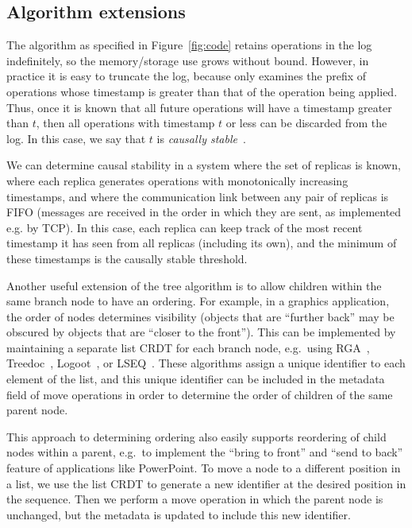 \documentclass[sigconf]{acmart}
\begin{document}
\subsection{Algorithm extensions}\label{sec:extensions}

The algorithm as specified in Figure~\ref{fig:code} retains operations in the log indefinitely, so the memory/storage use grows without bound.
However, in practice it is easy to truncate the log, because  only examines the prefix of operations whose timestamp is greater than that of the operation being applied.
Thus, once it is known that all future operations will have a timestamp greater than $t$, then all operations with timestamp $t$ or less can be discarded from the log.
In this case, we say that $t$ is \emph{causally stable}~\cite{Baquero:2014ed}.

We can determine causal stability in a system where the set of replicas is known, where each replica generates operations with monotonically increasing timestamps, and where the communication link between any pair of replicas is FIFO (messages are received in the order in which they are sent, as implemented e.g. by TCP).
In this case, each replica can keep track of the most recent timestamp it has seen from all replicas (including its own), and the minimum of these timestamps is the causally stable threshold.

Another useful extension of the tree algorithm is to allow children within the same branch node to have an ordering.
For example, in a graphics application, the order of nodes determines visibility (objects that are ``further back'' may be obscured by objects that are ``closer to the front'').
This can be implemented by maintaining a separate list CRDT for each branch node, e.g.\ using RGA~\cite{Roh:2011dw}, Treedoc~\cite{Preguica:2009fz}, Logoot~\cite{Weiss:2010hx}, or LSEQ~\cite{Nedelec:2013ky}.
These algorithms assign a unique identifier to each element of the list, and this unique identifier can be included in the metadata field of move operations in order to determine the order of children of the same parent node.

This approach to determining ordering also easily supports reordering of child nodes within a parent, e.g.\ to implement the ``bring to front'' and ``send to back'' feature of applications like PowerPoint.
To move a node to a different position in a list, we use the list CRDT to generate a new identifier at the desired position in the sequence.
Then we perform a move operation in which the parent node is unchanged, but the metadata is updated to include this new identifier.
\end{document}
